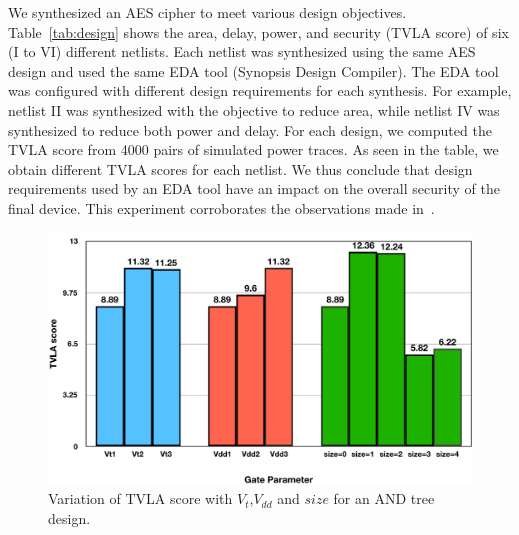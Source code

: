 {\flushleft We} synthesized an AES cipher to meet various design objectives. Table~\ref{tab:design} shows the area, delay, power, and security (TVLA score) of six (I to VI) different netlists. Each netlist was synthesized using the same AES design and used the same EDA tool (Synopsis Design Compiler). The EDA tool was configured with different design requirements for each synthesis. For example, netlist II was synthesized with the objective to reduce area, while netlist IV was synthesized to reduce both power and delay.
For each design, we computed the TVLA score from 4000 pairs of simulated power traces. As seen in the table, we obtain different TVLA scores for each netlist. We thus conclude that design requirements used by an EDA tool have an impact on the overall security of the final device. This experiment corroborates the observations made in~\cite{Verbauwhede:2005, danger:2017, yang:2005}. 
\begin{figure}[t!]
\centering
\includegraphics[scale=0.35]{Chapter4/fig/tvla_gate.pdf}
\caption{Variation of TVLA score with $V_{t}$,$V_{dd}$ and $size$ for an AND tree design.}
\label{fig:gateparam}
\end{figure}


